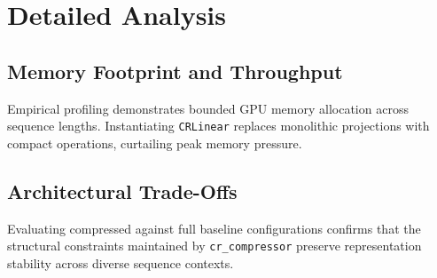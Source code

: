 \section{Detailed Analysis}

\subsection{Memory Footprint and Throughput}
Empirical profiling demonstrates bounded GPU memory allocation across sequence lengths. Instantiating \texttt{CRLinear} replaces monolithic projections with compact operations, curtailing peak memory pressure.

\subsection{Architectural Trade-Offs}
Evaluating compressed against full baseline configurations confirms that the structural constraints maintained by \texttt{cr_compressor} preserve representation stability across diverse sequence contexts.
